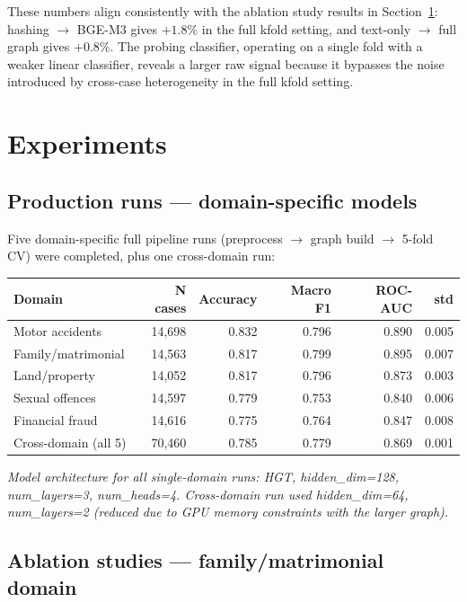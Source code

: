 \documentclass[12pt,a4paper]{article}
\begin{document}
These numbers align consistently with the ablation study results in Section~\ref{sec:experiments}: hashing $\to$ BGE-M3 gives $+1.8\%$ in the full kfold setting, and text-only $\to$ full graph gives $+0.8\%$. The probing classifier, operating on a single fold with a weaker linear classifier, reveals a larger raw signal because it bypasses the noise introduced by cross-case heterogeneity in the full kfold setting.

\section{Experiments}
\label{sec:experiments}

\subsection{Production runs — domain-specific models}

Five domain-specific full pipeline runs (preprocess $\to$ graph build $\to$ 5-fold CV) were completed, plus one cross-domain run:

\begin{center}
\begin{tabular}{lrrrrr}
\toprule
\textbf{Domain} & \textbf{N cases} & \textbf{Accuracy} & \textbf{Macro F1} & \textbf{ROC-AUC} & \textbf{std} \\
\midrule
Motor accidents & 14{,}698 & 0.832 & 0.796 & 0.890 & 0.005 \\
Family/matrimonial & 14{,}563 & 0.817 & 0.799 & 0.895 & 0.007 \\
Land/property & 14{,}052 & 0.817 & 0.796 & 0.873 & 0.003 \\
Sexual offences & 14{,}597 & 0.779 & 0.753 & 0.840 & 0.006 \\
Financial fraud & 14{,}616 & 0.775 & 0.764 & 0.847 & 0.008 \\
\midrule
Cross-domain (all 5) & 70{,}460 & 0.785 & 0.779 & 0.869 & 0.001 \\
\bottomrule
\end{tabular}
\end{center}

\textit{Model architecture for all single-domain runs: HGT, hidden\_dim=128, num\_layers=3, num\_heads=4. Cross-domain run used hidden\_dim=64, num\_layers=2 (reduced due to GPU memory constraints with the larger graph).}

\subsection{Ablation studies — family/matrimonial domain}
\end{document}
